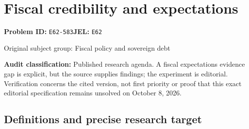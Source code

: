 \documentclass[11pt,a4paper]{article}
\begin{document}
\section*{Fiscal credibility and expectations}
\textbf{Problem ID:} \texttt{E62-583}\quad \textbf{JEL:} \texttt{E62}\par
\label{problem:OP-0260}
{\sffamily\small\color{muted}Original subject group: Fiscal policy and sovereign debt\par}
\label{definitions:problem:30007541}
\textbf{Audit classification:} Published research agenda. A fiscal expectations evidence gap is explicit, but the source supplies findings; the experiment is editorial. Verification concerns the cited version, not first priority or proof that this exact editorial specification remains unsolved on October 8, 2026.
\subsection*{Definitions and precise research target}
\end{document}
